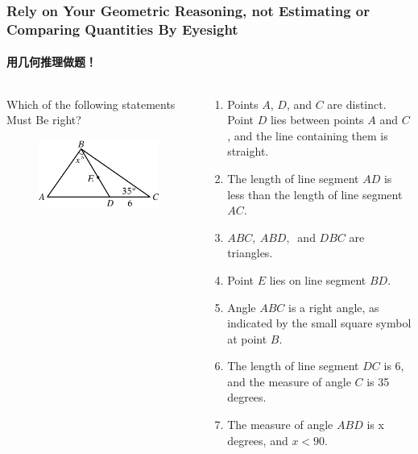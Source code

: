 \documentclass[
	11pt, %
	handout,
]{beamer}
\begin{document}
\begin{frame}
	\frametitle{Rely on Your Geometric Reasoning, not Estimating or Comparing Quantities By Eyesight} %
	\framesubtitle{用几何推理做题！}
	\begin{columns}[t] 
		\begin{column}{0.4\textwidth} %
		Which of the following statements \alert{Must Be} right?
			\begin{figure}
				\includegraphics[width=\linewidth]{Not_Scale.jpg}
			\end{figure}
		\end{column}

	\begin{column}{0.6\textwidth} %
	\begin{enumerate}
		\item Points $A$, $D$, and $C$ are distinct. Point $D$ lies between points $A$ and $C$, and the line containing them is straight.
		\item The length of line segment $AD$ is less than the length of line segment $AC$.
		\item $ABC,\ ABD,\ $ and $DBC$ are triangles.
		\item Point $E$ lies on line segment $BD$.
		\item Angle $ABC$ is a right angle, as indicated by the small square symbol at point $B$.
		\item The length of line segment $DC$ is 6, and the measure of angle $C$ is 35 degrees.
		\item The measure of angle $ABD$ is x degrees, and $x<90$.
	\end{enumerate}
	\end{column}
	\end{columns}
\end{frame}
\end{document}
